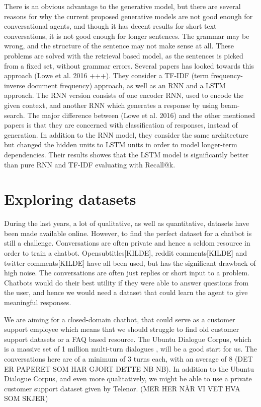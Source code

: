 \documentclass{article} %
\begin{document}
There is an obvious advantage to the generative model, but there are several reasons for why the current proposed generative models are not good enough for conversational agents, and though it has decent results for short text conversations, it is not good enough for longer sentences. The grammar may be wrong, and the structure of the sentence may not make sense at all. These problems are solved with the retrieval based model, as the sentences is picked from a fixed set, without grammar errors. Several papers has looked towards this approach (Lowe et al. 2016 +++). They consider a TF-IDF (term frequency-inverse document frequency) approach, as well as an RNN and a LSTM approach. The RNN version consists of one encoder RNN, used to encode the given context, and another RNN which generates a response by using beam-search. The major difference between (Lowe et al. 2016) and the other mentioned papers is that they are concerned with classification of responses, instead of generation. In addition to the RNN model, they consider the same architecture but changed the hidden units to LSTM units in order to model longer-term dependencies. Their results showes that the LSTM model is significantly better than pure RNN and TF-IDF evaluating with Recall@k.

\section{Exploring datasets}
During the last years, a lot of qualitative, as well as quantitative, datasets have been made available online. However, to find the perfect dataset for a chatbot is still a challenge. Conversations are often private and hence a seldom resource in order to train a chatbot. Opensubtitles[KILDE], reddit comments[KILDE] and twitter comments[KILDE] have all been used, but has the significant drawback of high noise. The conversations are often just replies or short input to a problem. Chatbots would do their best utility if they were able to answer questions from the user, and hence we would need a dataset that could learn the agent to give meaningful responses.

We are aiming for a closed-domain chatbot, that could serve as a customer support employee which means that we should struggle to find old customer support datasets or a FAQ based resource. The Ubuntu Dialogue Corpus, which is a massive set of 1 million multi-turn dialogues \cite{Lowe}, will be a good start for us. The conversations here are of a minimum of 3 turns each, with an average of 8 (DET ER PAPERET SOM HAR GJORT DETTE NB NB). In addition to the Ubuntu Dialogue Corpus, and even more qualitatively, we might be able to use a private customer support dataset given by Telenor. (MER HER NÅR VI VET HVA SOM SKJER)
\end{document}
